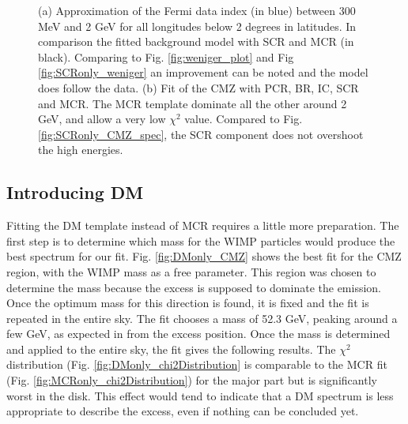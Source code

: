 \begin{figure}[h]
\begin{minipage}[h]{0.45\textwidth}
	  \subcaption{}
  	  \label{fig:MCRonly_CMZ}
  \end{minipage}
  \caption[MCR fit spectra.]{(a) Approximation of the Fermi data index (in blue) between 300 MeV and 2 GeV for all longitudes below 2 degrees in latitudes. In comparison the fitted background model with SCR and MCR (in black). Comparing to Fig. \ref{fig:weniger_plot} and Fig \ref{fig:SCRonly_weniger} an improvement can be noted and the model does follow the data. (b) Fit of the CMZ with PCR, BR, IC, SCR and MCR. The MCR template dominate all the other around 2 GeV, and allow a very low $\chi^2$ value. Compared to Fig. \ref{fig:SCRonly_CMZ_spec}, the SCR component does not overshoot the high energies.}
  \label{fig:MCR_vs_SCRonly_CMZ}
\end{figure}


\newpage
\subsection{Introducing DM}
%

%
%

Fitting the DM template instead of MCR requires a little more preparation. The first step is to determine which mass for the WIMP particles would produce the best spectrum for our fit. Fig. \ref{fig:DMonly_CMZ} shows the best fit for the CMZ region, with the WIMP mass as a free parameter. This region was chosen to determine the mass because the excess is supposed to dominate the emission. Once the optimum mass for this direction is found, it is fixed and the fit is repeated in the entire sky.
The fit chooses a mass of 52.3 GeV, peaking around a few GeV, as expected in from the excess position.
Once the mass is determined and applied to the entire sky, the fit gives the following results. The $\chi^2$ distribution (Fig. \ref{fig:DMonly_chi2Distribution} is comparable to the MCR fit (Fig. \ref{fig:MCRonly_chi2Distribution}) for the major part but is significantly worst in the disk. This effect would tend to indicate that a DM spectrum is less appropriate to describe the excess, even if nothing can be concluded yet.

